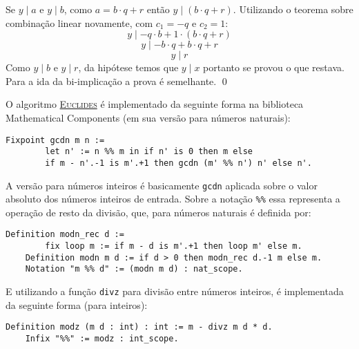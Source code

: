         Se $y \mid a$ e $y \mid b$, como $a = b \cdot q + r$ então
        $y \mid (b \cdot q + r)$. Utilizando o teorema sobre combinação linear novamente, com $c_1 = -q$ e $c_2 = 1$:
        \begin{equation*}
            y \mid -q \cdot b + 1 \cdot (b \cdot q + r) 
        \end{equation*}
        \begin{equation*}
            y \mid - b \cdot q + b \cdot q + r 
        \end{equation*}
        \begin{equation*}
            y \mid r 
        \end{equation*}
        Como $y \mid b$ e $y \mid r$, da hipótese temos que $y \mid x$ portanto se provou o que restava. Para a ida da bi-implicação a prova é semelhante. \qed

O algoritmo \hyperref[algo:euclides]{\textsc{Euclides}} é implementado da seguinte forma na biblioteca Mathematical Components (em sua versão para números naturais):
\begin{lstlisting}[language = coq]
    Fixpoint gcdn m n :=
        let n' := n %% m in if n' is 0 then m else
        if m - n'.-1 is m'.+1 then gcdn (m' %% n') n' else n'.
\end{lstlisting}
A versão para números inteiros é basicamente \lstinline[language = coq]{gcdn} aplicada sobre o valor absoluto dos números inteiros de entrada.
Sobre a notação \lstinline[language = coq]{%%} essa representa a operação de resto da divisão, que, para números naturais é definida por:
\begin{lstlisting}[language = coq]
    Definition modn_rec d := 
        fix loop m := if m - d is m'.+1 then loop m' else m.
    Definition modn m d := if d > 0 then modn_rec d.-1 m else m.
    Notation "m %% d" := (modn m d) : nat_scope.
\end{lstlisting}
E utilizando a função 
\lstinline[language = coq]{divz} para divisão entre números inteiros, é implementada da seguinte forma (para inteiros):
\begin{lstlisting}[language = coq]
    Definition modz (m d : int) : int := m - divz m d * d.
    Infix "%%" := modz : int_scope.
\end{lstlisting}

